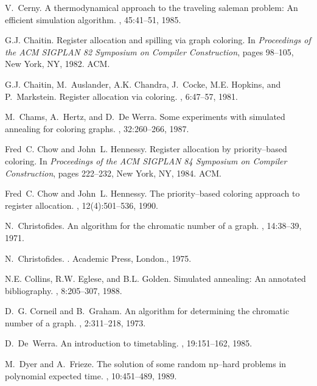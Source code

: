 \begin{thebibliography}{10}
V.~Cerny.
\newblock A thermodynamical approach to the traveling saleman problem: An
  efficient simulation algorithm.
, 45:41--51,
  1985.

G.J. Chaitin.
\newblock Register allocation and spilling via graph coloring.
\newblock In {\em Proceedings of the {ACM} {SIGPLAN} 82 Symposium on Compiler
  Construction}, pages 98--105, New York, NY, 1982. ACM.

G.J. Chaitin, M.~Auslander, A.K. Chandra, J.~Cocke, M.E. Hopkins, and
  P.~Markstein.
\newblock Register allocation via coloring.
, 6:47--57, 1981.

M.~Chams, A.~Hertz, and D.~De Werra.
\newblock Some experiments with simulated annealing for coloring graphs.
, 32:260--266, 1987.

Fred~C. Chow and John~L. Hennessy.
\newblock Register allocation by priority--based coloring.
\newblock In {\em Proceedings of the {ACM} {SIGPLAN} 84 Symposium on Compiler
  Construction}, pages 222--232, New York, NY, 1984. ACM.

Fred~C. Chow and John~L. Hennessy.
\newblock The priority--based coloring approach to register allocation.
,
  12(4):501--536, 1990.

N.~Christofides.
\newblock An algorithm for the chromatic number of a graph.
, 14:38--39, 1971.

N.~Christofides.
.
\newblock Academic Press, London., 1975.

N.E. Collins, R.W. Eglese, and B.L. Golden.
\newblock Simulated annealing: An annotated bibliography.
,
  8:205--307, 1988.

D.~G. Corneil and B.~Graham.
\newblock An algorithm for determining the chromatic number of a graph.
, 2:311--218, 1973.

D.~De~Werra.
\newblock An introduction to timetabling.
, 19:151--162, 1985.

M.~Dyer and A.~Frieze.
\newblock The solution of some random np--hard problems in polynomial expected
  time.
, 10:451--489, 1989.


\end{thebibliography}
